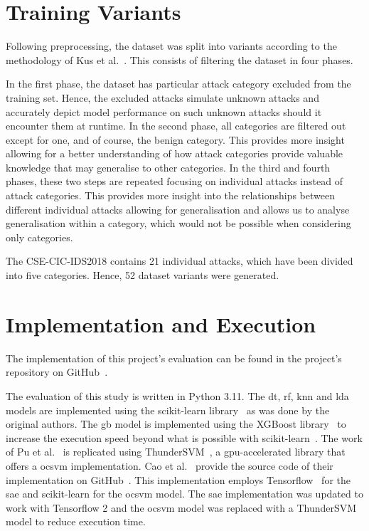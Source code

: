 \section{Training Variants}%
\label{sec:variants}

Following preprocessing, the dataset was split into variants according to the
methodology of Kus et al.~\cite{Kus}. This consists of filtering the dataset in
four phases.

In the first phase, the dataset has particular attack category excluded from
the training set. Hence, the excluded attacks simulate unknown attacks and
accurately depict model performance on such unknown attacks should it encounter
them at runtime. In the second phase, all categories are filtered out except
for one, and of course, the benign category. This provides more insight
allowing for a better understanding of how attack categories provide valuable
knowledge that may generalise to other categories. In the third and fourth
phases, these two steps are repeated focusing on individual attacks instead of
attack categories. This provides more insight into the relationships between
different individual attacks allowing for generalisation and allows us to
analyse generalisation within a category, which would not be possible when
considering only categories.

The CSE-CIC-IDS2018 contains 21 individual attacks, which have been divided
into five categories. Hence, 52 dataset variants were generated.

\section{Implementation and Execution}%
\label{sec:implementation}

The implementation of this project's evaluation can be found in the project's
repository on GitHub~\cite{repo}.

The evaluation of this study is written in Python 3.11. The \gls{dt}, \gls{rf},
\gls{knn} and \gls{lda} models are implemented using the scikit-learn
library~\cite{scikit-learn} as was done by the original authors. The \gls{gb}
model is implemented using the XGBoost library~\cite{xgboost} to increase the
execution speed beyond what is possible with scikit-learn~\cite{scikit-learn}.
The work of Pu et al.~\cite{Pu} is replicated using
ThunderSVM~\cite{ThunderSVM}, a \gls{gpu}-accelerated library that offers a
\gls{ocsvm} implementation. Cao et al.~\cite{Cao} provide the source code of
their implementation on GitHub~\cite{cao_git}. This implementation employs
Tensorflow~\cite{tensorflow} for the \gls{sae} and scikit-learn for the
\gls{ocsvm} model. The \gls{sae} implementation was updated to work with
Tensorflow 2 and the \gls{ocsvm} model was replaced with a
ThunderSVM~\cite{ThunderSVM} model to reduce execution time.

